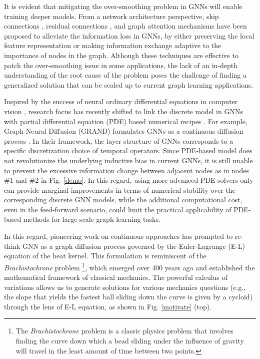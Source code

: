 \documentclass{article}
\begin{document}
It is evident that mitigating the over-smoothing problem in GNNs will enable training deeper models. From a network architecture perspective, skip connections \cite{gao2019graph,xu2018representation}, residual connections \cite{li2019deepgcns,guo2019densely}, and graph attention mechanisms \cite{velivckovic2017graph,thekumparampil2018attention} have been proposed to alleviate the information loss in GNNs, by either preserving the local feature representation or making information exchange adaptive to the importance of nodes in the graph. Although these techniques are effective to patch the over-smoothing issue in some applications, the lack of an in-depth understanding of the root cause of the problem poses the challenge of finding a generalized solution that can be scaled up to current graph learning applications.

Inspired by the success of neural ordinary differential equations in computer vision \cite{chen2018neural}, research focus has recently shifted to link the discrete model in GNNs with partial differential equation (PDE) based numerical recipes \cite{xhonneux2020continuous,poli2019graph,chamberlain2021grand, eliasof2021pde}. For example, Graph Neural Diffusion (GRAND) formulates GNNs as a continuous diffusion process \cite{chamberlain2021grand}. In their framework, the layer structure of GNNs corresponds to a specific discretization choice of temporal operators. Since PDE-based model does not revolutionize the underlying inductive bias in current GNNs, it is still unable to prevent the excessive information change between adjacent nodes as in nodes \#1 and \#2 in Fig. \ref{demo}. In this regard, using more advanced PDE solvers only can provide marginal improvements in terms of numerical stability over the corresponding discrete GNN models, while the additional computational cost, even in the feed-forward scenario, could limit the practical applicability of PDE-based methods for large-scale graph learning tasks.

In this regard, pioneering work on continuous approaches has prompted to re-think GNN as a graph diffusion process governed by the Euler-Lagrange (E-L) equation of the heat kernel. This formulation is reminiscent of the \textit{Brachistochrone} problem \footnote{The \textit{Brachistochrone} problem is a classic physics problem that involves finding the curve down which a bead sliding under the influence of gravity will travel in the least amount of time between two points.}, which emerged over 400 years ago and established the mathematical framework of classical mechanics. The powerful calculus of variations allows us to generate solutions for various mechanics questions (e.g., the slope that yields the fastest ball sliding down the curve is given by a cycloid) through the lens of E-L equation, as shown in Fig. \ref{motivate} (top).
\end{document}
